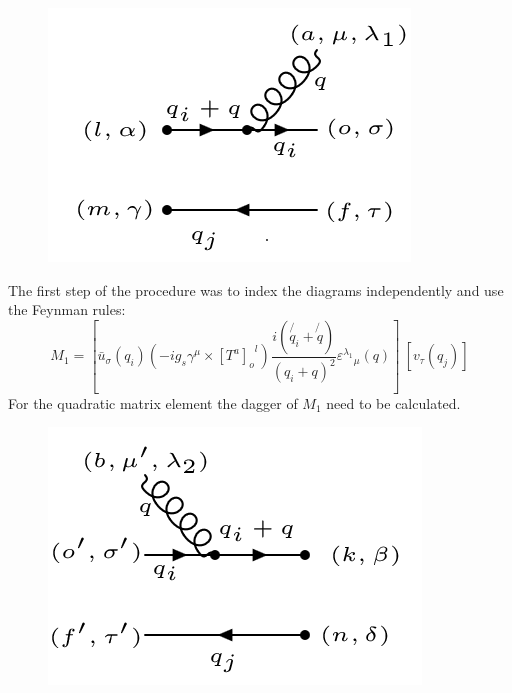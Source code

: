 \begin{figure}[h!]
\centering
\includegraphics[scale=0.7]{images/QQ/qgqbarM.png}
\end{figure}
The first step of the procedure was to index the diagrams independently and use the Feynman rules:
\begin{equation}
M_1 = [{\bar{u}}_{\sigma}(q_i) (-ig_s \gamma^{\mu}\times {[T^a]_o}^l)  \frac{i(\not{q_i} + \not{q})}{(q_i + q)^2} {\varepsilon^{\lambda_1}}_{\mu} (q)]\: [{v}_{\tau}(q_j)]
\end{equation}
For the quadratic matrix element the dagger of $ M_1 $ need to be calculated.
\begin{figure}[h!]
\centering
\includegraphics[scale=0.7]{images/QQ/qgqbarMDega.png}
\end{figure}

